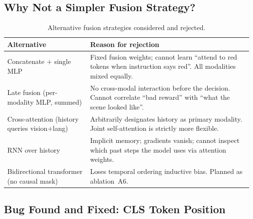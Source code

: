 \documentclass[12pt, a4paper]{article}
\begin{document}
\subsection{Why Not a Simpler Fusion Strategy?}
\label{sec:whynot}

\begin{table}[h]
\centering
\caption{Alternative fusion strategies considered and rejected.}
\begin{tabular}{L{4.5cm} L{8cm}}
\toprule
\textbf{Alternative} & \textbf{Reason for rejection} \\
\midrule
Concatenate + single MLP &
  Fixed fusion weights; cannot learn ``attend to red tokens when instruction
  says red''. All modalities mixed equally. \\
Late fusion (per-modality MLP, summed) &
  No cross-modal interaction before the decision.
  Cannot correlate ``bad reward'' with ``what the scene looked like''. \\
Cross-attention (history queries vision+lang) &
  Arbitrarily designates history as primary modality.
  Joint self-attention is strictly more flexible. \\
RNN over history &
  Implicit memory; gradients vanish; cannot inspect which past steps
  the model uses via attention weights. \\
Bidirectional transformer (no causal mask) &
  Loses temporal ordering inductive bias.
  Planned as ablation~A6. \\
\bottomrule
\end{tabular}
\end{table}

\subsection{Bug Found and Fixed: CLS Token Position}
\label{sec:bug}
\end{document}
